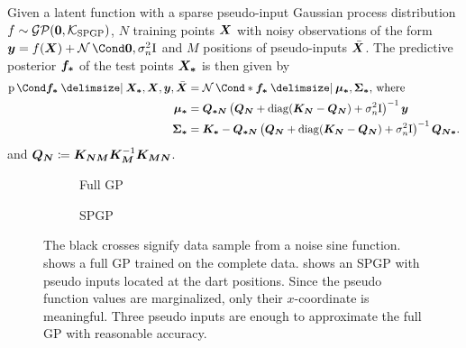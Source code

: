 \begin{lemma}
    \label{lem:spgp_posterior}
    Given a latent function with a sparse pseudo-input Gaussian process distribution $f \sim \operatorname{\mathcal{GP}}(\bm{0}, \operatorname{\mathcal{K}}_{\text{SPGP}})$, $N$ training points $\bm{X}$ with noisy observations of the form $\mat{y} = f(\mat{X}) + \Gaussian{\mat{0}, \sigma_n^2 \Eye}$ and $M$ positions of pseudo-inputs $\bar{\bm{X}}$.
    The predictive posterior $\bm{f_\ast}$ of the test points $\bm{X_\ast}$ is then given by
    \begin{align}
        \begin{split}
            \Prob{\mat{f_\ast} \given \mat{X_\ast}, \mat{X}, \mat{y}, \ps{\mat{X}}} &= \Gaussian*{\mat{f_\ast} \given \mat{\mu_\ast}, \mat{\Sigma_\ast}} \text{, where} \\
            \mat{\mu_\ast} &= \mat{Q_{\ast N}} \left( \mat{Q_N} + \diag(\mat{K_N} - \mat{Q_N}) + \sigma_n^2 \Eye \right)^{-1} \mat{y} \\
            \mat{\Sigma_\ast} &= \mat{K_\ast} - \mat{Q_{\ast N}} \left( \mat{Q_N} + \diag(\mat{K_N} - \mat{Q_N}) + \sigma_n^2 \Eye \right)^{-1} \mat{Q_{N \ast}}.
        \end{split}
    \end{align}
    and $\bm{Q_N} \coloneqq \bm{K_{N M}} \bm{K_M}^{-1} \bm{K_{M N}}$.
\end{lemma}
\begin{figure}[t]
    \centering
    \begin{subfigure}{\subfigurewidth}
        \centering
        \caption{Full GP}
        \label{fig:spgp_example:gp}
    \end{subfigure}
    \begin{subfigure}{\subfigurewidth}
        \centering
        \caption{SPGP}
        \label{fig:spgp_example:spgp}
    \end{subfigure}
    \caption[SPGP example]{
        The black crosses signify data sample from a noise sine function.
         shows a full GP trained on the complete data.
         shows an SPGP with pseudo inputs located at the dart positions.
        Since the pseudo function values are marginalized, only their $x$-coordinate is meaningful.
        Three pseudo inputs are enough to approximate the full GP with reasonable accuracy.
    }
    \label{fig:spgp_example}
\end{figure}

